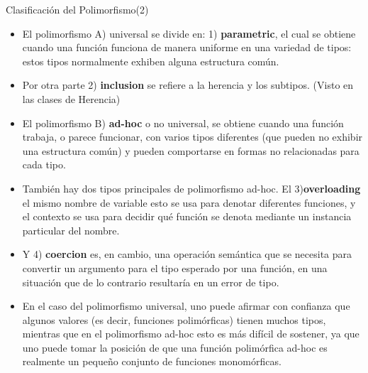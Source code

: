 \documentclass{beamer}
\begin{document}


\begin{frame}[fragile]{Clasificación del Polimorfismo(2)}

    \begin{itemize}
        \item El polimorfismo A) universal se divide en: 1) \textbf{parametric}, el cual se obtiene cuando una función funciona de manera uniforme en una variedad de tipos: estos tipos normalmente exhiben alguna estructura común.

        \item Por otra parte 2)  \textbf{inclusion} se refiere a la herencia y los subtipos. (Visto en las clases de Herencia)

        \item  El polimorfismo B) \textbf{ad-hoc} o no universal, se obtiene cuando una función trabaja, o parece funcionar, con varios tipos diferentes (que pueden no exhibir una estructura común) y pueden comportarse en formas no relacionadas para cada tipo.

        \item También hay dos tipos principales de polimorfismo ad-hoc. El 3)\textbf{overloading} el mismo nombre de variable esto se usa para denotar diferentes funciones, y el contexto se usa para decidir qué función se denota mediante un instancia particular del nombre.

        \item Y 4) \textbf{coercion} es, en cambio, una operación semántica que se necesita para convertir un argumento para el tipo esperado por una función, en una situación que de lo contrario resultaría en un error de tipo.

        \item En el caso del polimorfismo universal, uno puede afirmar con confianza que algunos valores (es decir, funciones polimórficas) tienen muchos tipos, mientras que en el polimorfismo ad-hoc esto es más difícil de sostener, ya que uno puede tomar la posición de que una función polimórfica ad-hoc es realmente un pequeño conjunto de funciones monomórficas.

    \end{itemize}


\end{frame}  


\end{document}
